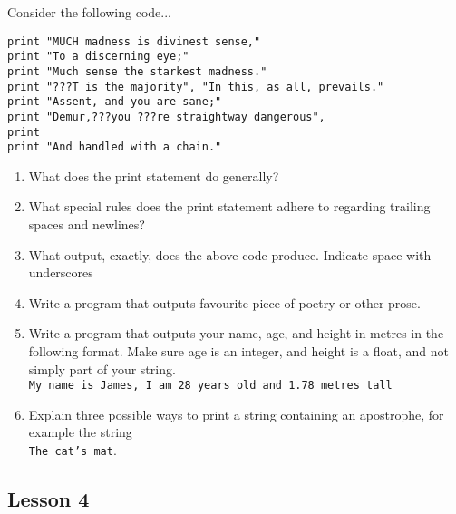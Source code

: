 \documentclass[a4paper,11pt]{article}
\begin{document}
Consider the following code...
\begin{lstlisting}
print "MUCH madness is divinest sense,"
print "To a discerning eye;"
print "Much sense the starkest madness."
print "???T is the majority", "In this, as all, prevails."
print "Assent, and you are sane;"
print "Demur,???you ???re straightway dangerous",
print
print "And handled with a chain."\end{lstlisting}
\begin{enumerate}
	\item What does the print statement do generally?
	\item What special rules does the print statement adhere to regarding    trailing spaces and newlines?
	\item What output, exactly, does the above code produce. Indicate    space with underscores
	\item Write a program that outputs favourite piece of poetry or other prose.
	\item Write a program that outputs your name, age, and height in    metres in the following format. Make sure age is an integer, and    height is a float, and not simply part of your string.
\\
\texttt{My name is James, I am 28 years old and 1.78 metres    tall}
	\item Explain three possible ways to print a string containing an    apostrophe, for example the string
\\
\texttt{The cat's    mat}.
\end{enumerate}

\subsection{Lesson 4}
\end{document}
